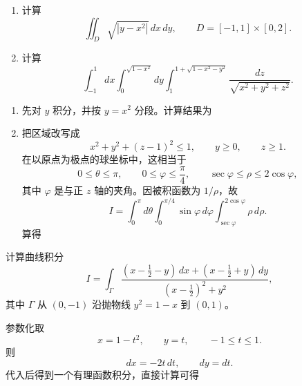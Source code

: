 ﻿

\begin{question}[计算积分]

\begin{enumerate}[label=(\arabic*),leftmargin=2.6em,itemsep=0.25em,topsep=0.2em]
\item 计算
\[
\iint_D\sqrt{|y-x^2|}\,dx\,dy,
\qquad D=[-1,1]\times[0,2].
\]
\item 计算
\[
\int_{-1}^{1}dx\int_{0}^{\sqrt{1-x^2}}dy\int_{1}^{1+\sqrt{1-x^2-y^2}}
\frac{dz}{\sqrt{x^2+y^2+z^2}}.
\]
\end{enumerate}

\begin{solution}

\begin{enumerate}[label=(\arabic*),leftmargin=2.6em,itemsep=0.25em,topsep=0.2em]
\item 先对 $y$ 积分，并按 $y=x^2$ 分段。计算结果为

\item 把区域改写成
\[
 x^2+y^2+(z-1)^2\le1,\qquad y\ge0,\qquad z\ge1.
\]
在以原点为极点的球坐标中，这相当于
\[
 0\le\theta\le\pi,
 \qquad 0\le\varphi\le\frac{\pi}{4},
 \qquad \sec\varphi\le\rho\le2\cos\varphi,
\]
其中 $\varphi$ 是与正 $z$ 轴的夹角。因被积函数为 $1/\rho$，故
\[
 I=\int_0^{\pi}\!d\theta\int_0^{\pi/4}\!\sin\varphi\,d\varphi
 \int_{\sec\varphi}^{2\cos\varphi}\rho\,d\rho.
\]
算得
\end{enumerate}

\end{solution}
\end{question}

\begin{question}[曲线积分]

计算曲线积分
\[
 I=\int_{\Gamma}\frac{(x-\tfrac12-y)\,dx+(x-\tfrac12+y)\,dy}{(x-\tfrac12)^2+y^2},
\]
其中 $\Gamma$ 从 $(0,-1)$ 沿抛物线 $y^2=1-x$ 到 $(0,1)$。

\begin{solution}

参数化取
\[
 x=1-t^2,\qquad y=t,\qquad -1\le t\le1.
\]
则
\[
 dx=-2t\,dt,\qquad dy=dt.
\]
代入后得到一个有理函数积分，直接计算可得

\end{solution}
\end{question}

